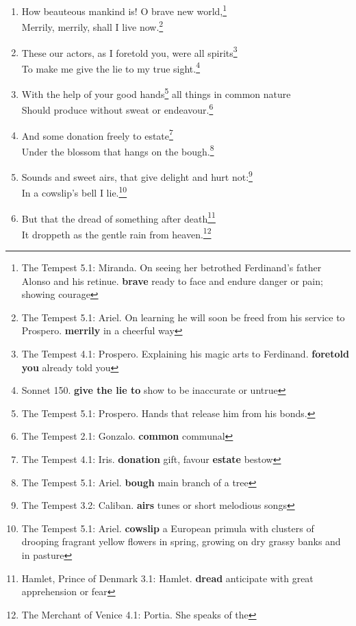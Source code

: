 \documentclass[17pt,twoside]{extarticle}
\begin{document}
\begin{enumerate}
{    Well 1.3: Helena. \textbf{manifest} clear or obvious to the eye or
    mind}\\Of drops that sacred pity hath engend'red.\footnote{As You
    Like It 2.7: Duke Senior. \textbf{engendered} cause or give rise to
    (a feeling, situation, or condition)}
\item
  How beauteous mankind is! O brave new world,\footnote{The Tempest 5.1:
    Miranda. On seeing her betrothed Ferdinand's father Alonso and his
    retinue. \textbf{brave} ready to face and endure danger or pain;
    showing courage}\\Merrily, merrily, shall I live now.\footnote{The
    Tempest 5.1: Ariel. On learning he will soon be freed from his
    service to Prospero. \textbf{merrily} in a cheerful way}
\item
  These our actors, as I foretold you, were all spirits\footnote{The
    Tempest 4.1: Prospero. Explaining his magic arts to Ferdinand.
    \textbf{foretold you} already told you}\\To make me give the lie to
  my true sight.\footnote{Sonnet 150. \textbf{give the lie to} show to
    be inaccurate or untrue}
\item
  With the help of your good hands\footnote{The Tempest 5.1: Prospero.
    Hands that release him from his bonds.} all things in common
  nature\\Should produce without sweat or endeavour.\footnote{The
    Tempest 2.1: Gonzalo. \textbf{common} communal}
\item
  And some donation freely to estate\footnote{The Tempest 4.1: Iris.
    \textbf{donation} gift, favour \textbf{estate} bestow}\\Under the
  blossom that hangs on the bough.\footnote{The Tempest 5.1: Ariel.
    \textbf{bough} main branch of a tree}
\item
  Sounds and sweet airs, that give delight and hurt not:\footnote{The
    Tempest 3.2: Caliban. \textbf{airs} tunes or short melodious songs}\\In
  a cowslip's bell I lie.\footnote{The Tempest 5.1: Ariel.
    \textbf{cowslip} a European primula with clusters of drooping
    fragrant yellow flowers in spring, growing on dry grassy banks and
    in pasture}
\item
  But that the dread of something after death\footnote{Hamlet, Prince of
    Denmark 3.1: Hamlet. \textbf{dread} anticipate with great
    apprehension or fear}\\It droppeth as the gentle rain from
  heaven.\footnote{The Merchant of Venice 4.1: Portia. She speaks of the
}
\end{enumerate}
\end{document}
